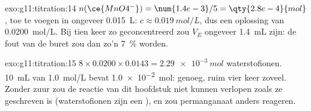 \begin{solution}{exo:g11:titration:14}
$n(\ce{MnO4^-}) = \num{1.4e-3} / 5 = \qty{2.8e-4}{mol}$, toe te voegen
in ongeveer \qty{0.015}{L}: $c \approx \qty{0.019}{mol/L}$, dus een
oplossing van \qty{0.0200}{mol/L}. Bij tien keer zo geconcentreerd zou
$V_E$ ongeveer \qty{1.4}{mL} zijn: de fout van de buret zou dan zo'n
\qty{7}{\percent} worden.
\end{solution}

\begin{solution}{exo:g11:titration:15}
$8 \times 0.0200 \times 0.0143 = \qty{2.29e-3}{mol}$ waterstofionen.
\qty{10}{mL} van \qty{1.0}{mol/L} bevat \qty{1.0e-2}{mol}: genoeg, ruim
vier keer zoveel. Zonder zuur zou de reactie van dit hoofdstuk niet
kunnen verlopen zoals ze geschreven is (waterstofionen zijn een
), en zou permanganaat anders reageren.
\end{solution}

